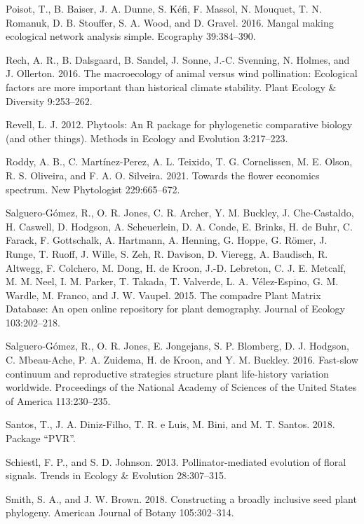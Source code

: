 \documentclass[12pt,a4paper,]{article}
\begin{document}
\hypertarget{ref-poisot2016}{}
Poisot, T., B. Baiser, J. A. Dunne, S. Kéfi, F. Massol, N. Mouquet, T.
N. Romanuk, D. B. Stouffer, S. A. Wood, and D. Gravel. 2016. Mangal
making ecological network analysis simple. Ecography 39:384--390.

\hypertarget{ref-rech2016}{}
Rech, A. R., B. Dalsgaard, B. Sandel, J. Sonne, J.-C. Svenning, N.
Holmes, and J. Ollerton. 2016. The macroecology of animal versus wind
pollination: Ecological factors are more important than historical
climate stability. Plant Ecology \& Diversity 9:253--262.

\hypertarget{ref-revell2012}{}
Revell, L. J. 2012. Phytools: An R package for phylogenetic comparative
biology (and other things). Methods in Ecology and Evolution 3:217--223.

\hypertarget{ref-roddy2021}{}
Roddy, A. B., C. Martínez-Perez, A. L. Teixido, T. G. Cornelissen, M. E.
Olson, R. S. Oliveira, and F. A. O. Silveira. 2021. Towards the flower
economics spectrum. New Phytologist 229:665--672.

\hypertarget{ref-salguero2015}{}
Salguero-Gómez, R., O. R. Jones, C. R. Archer, Y. M. Buckley, J.
Che-Castaldo, H. Caswell, D. Hodgson, A. Scheuerlein, D. A. Conde, E.
Brinks, H. de Buhr, C. Farack, F. Gottschalk, A. Hartmann, A. Henning,
G. Hoppe, G. Römer, J. Runge, T. Ruoff, J. Wille, S. Zeh, R. Davison, D.
Vieregg, A. Baudisch, R. Altwegg, F. Colchero, M. Dong, H. de Kroon,
J.-D. Lebreton, C. J. E. Metcalf, M. M. Neel, I. M. Parker, T. Takada,
T. Valverde, L. A. Vélez-Espino, G. M. Wardle, M. Franco, and J. W.
Vaupel. 2015. The compadre Plant Matrix Database: An open online
repository for plant demography. Journal of Ecology 103:202--218.

\hypertarget{ref-salguero2016}{}
Salguero-Gómez, R., O. R. Jones, E. Jongejans, S. P. Blomberg, D. J.
Hodgson, C. Mbeau-Ache, P. A. Zuidema, H. de Kroon, and Y. M. Buckley.
2016. Fast-slow continuum and reproductive strategies structure plant
life-history variation worldwide. Proceedings of the National Academy of
Sciences of the United States of America 113:230--235.

\hypertarget{ref-santos2018}{}
Santos, T., J. A. Diniz-Filho, T. R. e Luis, M. Bini, and M. T. Santos.
2018. Package ``PVR''.

\hypertarget{ref-schiestl2013}{}
Schiestl, F. P., and S. D. Johnson. 2013. Pollinator-mediated evolution
of floral signals. Trends in Ecology \& Evolution 28:307--315.

\hypertarget{ref-smith2018}{}
Smith, S. A., and J. W. Brown. 2018. Constructing a broadly inclusive
seed plant phylogeny. American Journal of Botany 105:302--314.
\end{document}
